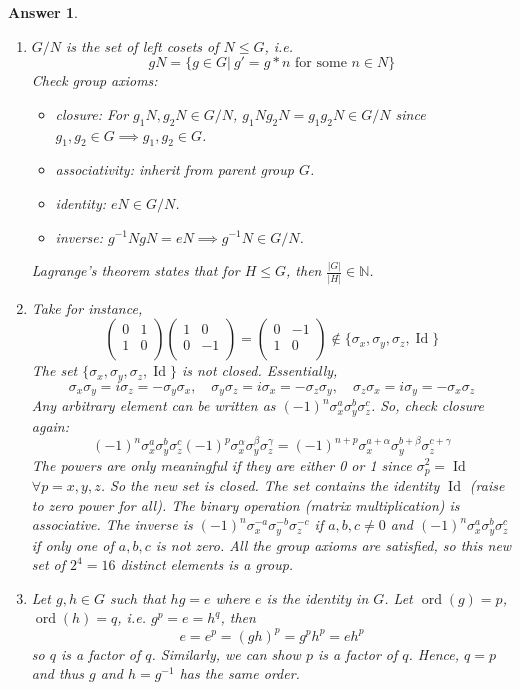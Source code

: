 \documentclass[a4paper]{article}
\DeclareMathOperator{\ord}{ord}
\DeclareMathOperator{\Id}{Id}
\newtheorem{ans}{Answer}[section]
\theoremstyle{new}
\begin{document}
\begin{ans}\leavevmode
\begin{enumerate}[label=(\alph*)]
\item $G/N$ is the set of left cosets of $N\leq G$, i.e.
$$gN=\{g\in G|~g'=g*n\text{ for some }n\in N\}$$
Check group axioms:
\begin{itemize}
    \item closure: For $g_1N,g_2N\in G/N$, $g_1Ng_2N=g_1g_2N\in G/N$ since $g_1,g_2\in G\implies g_1,g_2\in G$.
    \item associativity: inherit from parent group $G$.
    \item identity: $eN\in G/N$.
    \item inverse: $g^{-1}NgN=eN\implies g^{-1}N\in G/N$.
\end{itemize}
Lagrange's theorem states that for $H\leq G$, then $\frac{|G|}{|H|}\in\mathbb{N}$.
\item Take for instance,
$$\begin{pmatrix}0&1\\1&0\\\end{pmatrix}\begin{pmatrix}1&0\\0&-1\\\end{pmatrix}=\begin{pmatrix}0&-1\\1&0\\\end{pmatrix}\notin\{\sigma_x,\sigma_y,\sigma_z,\Id\}$$
The set $\{\sigma_x,\sigma_y,\sigma_z,\Id\}$ is not closed. Essentially,
$$\sigma_x\sigma_y=i\sigma_z=-\sigma_y\sigma_x,\quad\sigma_y\sigma_z=i\sigma_x=-\sigma_z\sigma_y,\quad \sigma_z\sigma_x=i\sigma_y=-\sigma_x\sigma_z$$
Any arbitrary element can be written as $(-1)^n\sigma_x^a\sigma_y^b\sigma_z^c$. So, check closure again:
$$(-1)^n\sigma_x^a\sigma_y^b\sigma_z^c(-1)^p\sigma_x^\alpha\sigma_y^\beta\sigma_z^\gamma=(-1)^{n+p}\sigma_x^{a+\alpha}\sigma_y^{b
+\beta}\sigma_z^{c+\gamma}$$
The powers are only meaningful if they are either 0 or 1 since $\sigma_p^2=\Id$ $\forall p=x,y,z$. So the new set is closed. The set contains the identity $\Id$ (raise to zero power for all). The binary operation (matrix multiplication) is associative. The inverse is $(-1)^n\sigma_x^{-a}\sigma_y^{-b}\sigma_z^{-c}$ if $a,b,c\neq 0$ and $(-1)^n\sigma_x^a\sigma_y^b\sigma_z^c$ if only one of $a,b,c$ is not zero. All the group axioms are satisfied, so this new set of $2^4=16$ distinct elements is a group.
\item Let $g,h\in G$ such that $hg=e$ where $e$ is the identity in $G$. Let $\ord(g)=p$, $\ord(h)=q$, i.e. $g^p=e=h^q$, then 
$$e=e^p=(gh)^p=g^ph^p=eh^p$$
so $q$ is a factor of $q$. Similarly, we can show $p$ is a factor of $q$. Hence, $q=p$ and thus $g$ and $h=g^{-1}$ has the same order.

\end{enumerate}
\end{ans}
\end{document}
